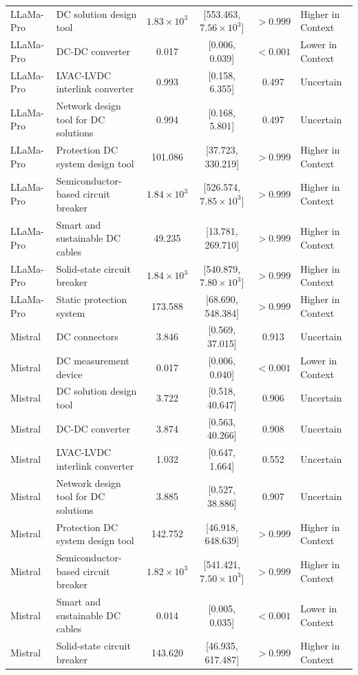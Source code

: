 \begin{longtable}[tbp]{p{2.3cm}p{5.0cm}cccp{3.2cm}}
LLaMa-Pro & DC solution design tool & $1.83\times 10^{3}$ & [553.463, $7.56\times 10^{3}$] & $>0.999$ & Higher in Context \\
LLaMa-Pro & DC-DC converter & 0.017 & [0.006, 0.039] & $<0.001$ & Lower in Context \\
LLaMa-Pro & LVAC-LVDC interlink converter & 0.993 & [0.158, 6.355] & 0.497 & Uncertain \\
LLaMa-Pro & Network design tool for DC solutions & 0.994 & [0.168, 5.801] & 0.497 & Uncertain \\
LLaMa-Pro & Protection DC system design tool & 101.086 & [37.723, 330.219] & $>0.999$ & Higher in Context \\
LLaMa-Pro & Semiconductor-based circuit breaker & $1.84\times 10^{3}$ & [526.574, $7.85\times 10^{3}$] & $>0.999$ & Higher in Context \\
LLaMa-Pro & Smart and sustainable DC cables & 49.235 & [13.781, 269.710] & $>0.999$ & Higher in Context \\
LLaMa-Pro & Solid-state circuit breaker & $1.84\times 10^{3}$ & [540.879, $7.80\times 10^{3}$] & $>0.999$ & Higher in Context \\
LLaMa-Pro & Static protection system & 173.588 & [68.690, 548.384] & $>0.999$ & Higher in Context \\
Mistral & DC connectors & 3.846 & [0.569, 37.015] & 0.913 & Uncertain \\
Mistral & DC measurement device & 0.017 & [0.006, 0.040] & $<0.001$ & Lower in Context \\
Mistral & DC solution design tool & 3.722 & [0.518, 40.647] & 0.906 & Uncertain \\
Mistral & DC-DC converter & 3.874 & [0.563, 40.266] & 0.908 & Uncertain \\
Mistral & LVAC-LVDC interlink converter & 1.032 & [0.647, 1.664] & 0.552 & Uncertain \\
Mistral & Network design tool for DC solutions & 3.885 & [0.527, 38.886] & 0.907 & Uncertain \\
Mistral & Protection DC system design tool & 142.752 & [46.918, 648.639] & $>0.999$ & Higher in Context \\
Mistral & Semiconductor-based circuit breaker & $1.82\times 10^{3}$ & [541.421, $7.50\times 10^{3}$] & $>0.999$ & Higher in Context \\
Mistral & Smart and sustainable DC cables & 0.014 & [0.005, 0.035] & $<0.001$ & Lower in Context \\
Mistral & Solid-state circuit breaker & 143.620 & [46.935, 617.487] & $>0.999$ & Higher in Context \\

\end{longtable}
